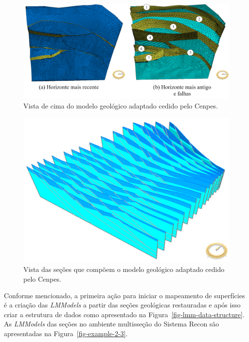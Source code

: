\begin{figure} [H]
  \begin{center}
    \includegraphics[width=\textwidth]{images/fig-example-2-1}
    \caption{Vista de cima do modelo geológico adaptado cedido pelo Cenpes.}\label{fig-example-2-1}
  \end{center}
\end{figure}



\begin{figure} [H]
  \begin{center}
    \includegraphics[width=320pt]{images/fig-example-2-2}
    \caption{Vista das seções que compõem o modelo geológico adaptado cedido pelo Cenpes.}\label{fig-example-2-2}
  \end{center}
\end{figure}

Conforme mencionado, a primeira ação para iniciar o mapeamento de superfícies é a criação das \textit{LMModels} a partir das seções geológicas restauradas e após isso criar a estrutura de dados como apresentado na Figura~\ref{fig-lmm-data-structure}. As \textit{LMModels} das seções no ambiente multisseção do Sistema Recon são apresentadas na Figura~\ref{fig-example-2-3}.

